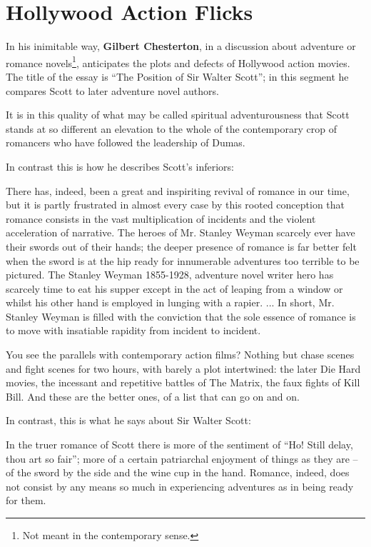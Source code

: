 \section{Hollywood Action Flicks}


In his inimitable way, \textbf{Gilbert Chesterton}, in a discussion about adventure or romance novels\footnote{Not meant in the contemporary sense.}, anticipates the plots and defects of Hollywood action movies. The title of the essay is ``The Position of Sir Walter Scott''; in this segment he compares Scott to later adventure novel authors.

\begin{quotex}
It is in this quality of what may be called spiritual adventurousness that Scott stands at so different an elevation to the whole of the contemporary crop of romancers who have followed the leadership of Dumas.
\end{quotex}


In contrast this is how he describes Scott's inferiors:

\begin{quotex}
There has, indeed, been a great and inspiriting revival of romance in our time, but it is partly frustrated in almost every case by this rooted conception that romance consists in the vast multiplication of incidents and the violent acceleration of narrative. The heroes of Mr. Stanley Weyman scarcely ever have their swords out of their hands; the deeper presence of romance is far better felt when the sword is at the hip ready for innumerable adventures too terrible to be pictured. The Stanley Weyman 1855-1928, adventure novel writer hero has scarcely time to eat his supper except in the act of leaping from a window or whilst his other hand is employed in lunging with a rapier. ... In short, Mr. Stanley Weyman is filled with the conviction that the sole essence of romance is to move with insatiable rapidity from incident to incident.
\end{quotex}


You see the parallels with contemporary action films? Nothing but chase scenes and fight scenes for two hours, with barely a plot intertwined: the later Die Hard movies, the incessant and repetitive battles of The Matrix, the faux fights of Kill Bill. And these are the better ones, of a list that can go on and on.

In contrast, this is what he says about Sir Walter Scott:

\begin{quotex}
In the truer romance of Scott there is more of the sentiment of ``Ho! Still delay, thou art so fair''; more of a certain patriarchal enjoyment of things as they are -- of the sword by the side and the wine cup in the hand. Romance, indeed, does not consist by any means so much in experiencing adventures as in being ready for them.
\end{quotex}


